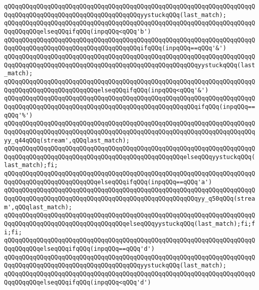 \verb|qQQqqQQqqQQqqQQqqQQqqQQqqQQqqQQqqQQqqQQqqQQqqQQqqQQqqQQqqQQqqQQqqQQqqQQqqQQqqQQqqQQqqQQqqQQqqQQqqQQqqQQqqQQqyystuckqQQq(last_match);|\newline
\verb|qQQqqQQqqQQqqQQqqQQqqQQqqQQqqQQqqQQqqQQqqQQqqQQqqQQqqQQqqQQqqQQqqQQqqQQqqQQqqQQqelseqQQqifqQQq(inpqQQq<qQQq'b')|\newline
\verb|qQQqqQQqqQQqqQQqqQQqqQQqqQQqqQQqqQQqqQQqqQQqqQQqqQQqqQQqqQQqqQQqqQQqqQQqqQQqqQQqqQQqqQQqqQQqqQQqqQQqqQQqqQQqifqQQq(inpqQQq==qQQq'&')|\newline
\verb|qQQqqQQqqQQqqQQqqQQqqQQqqQQqqQQqqQQqqQQqqQQqqQQqqQQqqQQqqQQqqQQqqQQqqQQqqQQqqQQqqQQqqQQqqQQqqQQqqQQqqQQqqQQqqQQqqQQqqQQqqQQqyystuckqQQq(last_match);|\newline
\verb|qQQqqQQqqQQqqQQqqQQqqQQqqQQqqQQqqQQqqQQqqQQqqQQqqQQqqQQqqQQqqQQqqQQqqQQqqQQqqQQqqQQqqQQqqQQqqQQqelseqQQqifqQQq(inpqQQq<qQQq'&')|\newline
\verb|qQQqqQQqqQQqqQQqqQQqqQQqqQQqqQQqqQQqqQQqqQQqqQQqqQQqqQQqqQQqqQQqqQQqqQQqqQQqqQQqqQQqqQQqqQQqqQQqqQQqqQQqqQQqqQQqqQQqqQQqqQQqifqQQq(inpqQQq==qQQq'%')|\newline
\verb|qQQqqQQqqQQqqQQqqQQqqQQqqQQqqQQqqQQqqQQqqQQqqQQqqQQqqQQqqQQqqQQqqQQqqQQqqQQqqQQqqQQqqQQqqQQqqQQqqQQqqQQqqQQqqQQqqQQqqQQqqQQqqQQqqQQqqQQqqQQqyy_q44qQQq(stream',qQQqlast_match);|\newline
\verb|qQQqqQQqqQQqqQQqqQQqqQQqqQQqqQQqqQQqqQQqqQQqqQQqqQQqqQQqqQQqqQQqqQQqqQQqqQQqqQQqqQQqqQQqqQQqqQQqqQQqqQQqqQQqqQQqqQQqqQQqelseqQQqyystuckqQQq(last_match);fi;|\newline
\verb|qQQqqQQqqQQqqQQqqQQqqQQqqQQqqQQqqQQqqQQqqQQqqQQqqQQqqQQqqQQqqQQqqQQqqQQqqQQqqQQqqQQqqQQqqQQqqQQqelseqQQqifqQQq(inpqQQq==qQQq'a')|\newline
\verb|qQQqqQQqqQQqqQQqqQQqqQQqqQQqqQQqqQQqqQQqqQQqqQQqqQQqqQQqqQQqqQQqqQQqqQQqqQQqqQQqqQQqqQQqqQQqqQQqqQQqqQQqqQQqqQQqqQQqqQQqqQQqyy_q50qQQq(stream',qQQqlast_match);|\newline
\verb|qQQqqQQqqQQqqQQqqQQqqQQqqQQqqQQqqQQqqQQqqQQqqQQqqQQqqQQqqQQqqQQqqQQqqQQqqQQqqQQqqQQqqQQqqQQqqQQqqQQqqQQqelseqQQqyystuckqQQq(last_match);fi;fi;fi;|\newline
\verb|qQQqqQQqqQQqqQQqqQQqqQQqqQQqqQQqqQQqqQQqqQQqqQQqqQQqqQQqqQQqqQQqqQQqqQQqqQQqqQQqelseqQQqifqQQq(inpqQQq==qQQq'd')|\newline
\verb|qQQqqQQqqQQqqQQqqQQqqQQqqQQqqQQqqQQqqQQqqQQqqQQqqQQqqQQqqQQqqQQqqQQqqQQqqQQqqQQqqQQqqQQqqQQqqQQqqQQqqQQqqQQqyystuckqQQq(last_match);|\newline
\verb|qQQqqQQqqQQqqQQqqQQqqQQqqQQqqQQqqQQqqQQqqQQqqQQqqQQqqQQqqQQqqQQqqQQqqQQqqQQqqQQqelseqQQqifqQQq(inpqQQq<qQQq'd')|\newline
